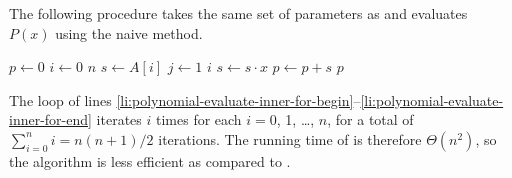 The following procedure takes the same set of parameters as  and evaluates $P(x)$ using the naive method.

\begin{codebox}
\li $p\gets0$
\li \For $i\gets0$ \To $n$
\li     \Do $s\gets A[i]$
\li         \For $j\gets1$ \To $i$ \label{li:polynomial-evaluate-inner-for-begin}
\li             \Do $s\gets s\cdot x$
                \End \label{li:polynomial-evaluate-inner-for-end}
\li         $p\gets p+s$
        \End
\li \Return $p$
\end{codebox}

The  loop of lines \ref{li:polynomial-evaluate-inner-for-begin}--\ref{li:polynomial-evaluate-inner-for-end} iterates $i$ times for each $i=0$, 1, \dots, $n$, for a total of $\sum_{i=0}^ni=n(n+1)/2$ iterations.
The running time of  is therefore $\Theta(n^2)$, so the algorithm is less efficient as compared to .
